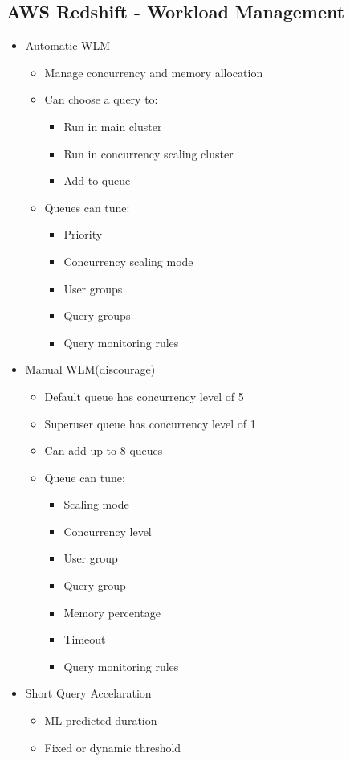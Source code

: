 \documentclass[../../main.tex]{subfiles}
\begin{document}
\subsection{AWS Redshift - Workload Management}
\begin{itemize}
    \item Automatic WLM
    \begin{itemize}
        \item Manage concurrency and memory allocation
        \item Can choose a query to:
        \begin{itemize}
            \item Run in main cluster
            \item Run in concurrency scaling cluster
            \item Add to queue
        \end{itemize}
        \item Queues can tune:
        \begin{itemize}
            \item Priority
            \item Concurrency scaling mode
            \item User groups
            \item Query groups
            \item Query monitoring rules
        \end{itemize}
    \end{itemize}
    \item Manual WLM(discourage)
    \begin{itemize}
        \item Default queue has concurrency level of 5
        \item Superuser queue has concurrency level of 1
        \item Can add up to 8 queues
        \item Queue can tune:
        \begin{itemize}
            \item Scaling mode
            \item Concurrency level
            \item User group
            \item Query group
            \item Memory percentage
            \item Timeout
            \item Query monitoring rules
        \end{itemize}
    \end{itemize}
    \item Short Query Accelaration
    \begin{itemize}
        \item ML predicted duration
        \item Fixed or dynamic threshold
    \end{itemize}
\end{itemize}
\end{document}
